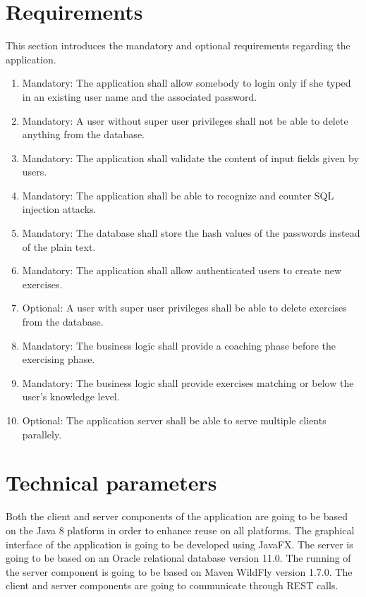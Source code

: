 \documentclass[a4paper]{article}
\begin{document}
	
	\section{Requirements}
	This section introduces the mandatory and optional requirements regarding the application.
	\begin{enumerate}
		\item Mandatory: The application shall allow somebody to login only if she typed in an existing user name and the associated password.
		\item Mandatory: A user without super user privileges shall not be able to delete anything from the database.
		\item Mandatory:  The application shall validate the content of input fields given by users.
		\item Mandatory:  The application shall be able to recognize and counter SQL injection attacks.
		\item Mandatory:  The database shall store the hash values of the passwords instead of the plain text.
		\item Mandatory: The application shall allow authenticated users to create new exercises.
		\item Optional: A user with super user privileges shall be able to delete exercises from the database.
		\item Mandatory: The business logic shall provide a coaching phase before the exercising phase.
		\item  Mandatory:  The business logic shall provide exercises matching or below the user's knowledge level.
		\item Optional: The application server shall be able to serve multiple clients parallely. 

	\end{enumerate}
	
	\section{Technical parameters}
	Both the client and server components of the application are going to be based on the Java 8 platform in order to enhance reuse on all platforms. The graphical interface of the application is going to be developed using JavaFX. The server is going to be based on an Oracle relational database version 11.0. The running of the server component is going to be based on Maven WildFly version 1.7.0. The client and server components are going to communicate through REST calls.
	
\end{document}
